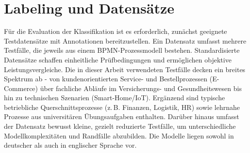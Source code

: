 \chapter{Labeling und Datensätze}\label{ch:labeling-und-datensatze}

Für die Evaluation der Klassifikation ist es erforderlich, zunächst geeignete Testdatensätze mit Annotationen bereitzustellen. Ein Datensatz umfasst mehrere Testfälle, die jeweils aus einem \ac{BPMN}-Prozessmodell bestehen. Standardisierte Datensätze schaffen einheitliche Prüfbedingungen und ermöglichen objektive Leistungsvergleiche. Die in dieser Arbeit verwendeten Testfälle decken ein breites Spektrum ab - von kundenorientierten Service- und Bestellprozessen (E-Commerce) über fachliche Abläufe im Versicherungs- und Gesundheitswesen bis hin zu technischen Szenarien (Smart-Home/IoT). Ergänzend sind typische betriebliche Querschnittsprozesse (z.\,B. Finanzen, Logistik, HR) sowie lehrnahe Prozesse aus universitären Übungsaufgaben enthalten. Darüber hinaus umfasst der Datensatz bewusst kleine, gezielt reduzierte Testfälle, um unterschiedliche Modellkomplexitäten und Randfälle abzubilden. Die Modelle liegen sowohl in deutscher als auch in englischer Sprache vor.



